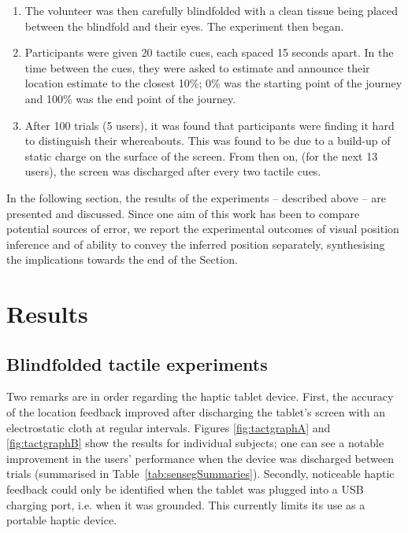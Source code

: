 \begin{enumerate}
\item The volunteer was then carefully blindfolded with a clean tissue being placed between the blindfold and their eyes. The experiment then began.

\item Participants were given 20 tactile cues, each spaced 15 seconds apart. In the time between the cues, they were asked to estimate and announce their location estimate to the closest 10\%; 0\% was the starting point of the journey and 100\% was the end point of the journey.

\item After 100 trials (5 users), it was found that participants were finding it hard to distinguish their whereabouts. This was found to be due to a build-up of static charge on the surface of the screen. From then on, (for the next 13 users), the screen was discharged after every two tactile cues.

\end{enumerate}
In the following section, the results of the experiments -- described above -- are presented and discussed. Since one aim of this work has been to compare potential sources of error, we report the experimental outcomes of visual position inference and of ability to convey the inferred position separately, synthesising the implications towards the end of the Section.

\section{Results}
\label{sec:ch6results}

\subsection{Blindfolded tactile experiments}


Two remarks are in order regarding the haptic tablet device. First, the accuracy of the location feedback improved after discharging the tablet's screen with an electrostatic cloth at regular intervals. Figures \ref{fig:tactgraphA} and \ref{fig:tactgraphB} show the results for individual subjects; one can see a notable improvement in the users' performance when the device was discharged between trials (summarised in Table~\ref{tab:sensegSummaries}). Secondly, noticeable haptic feedback could only be identified when the tablet was plugged into a USB charging port, i.e. when it was grounded. This currently limits its use as a portable haptic device.
  
